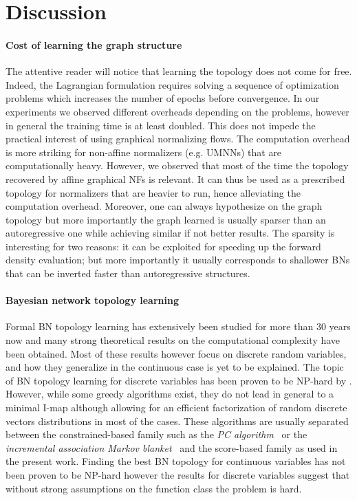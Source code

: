 \documentclass[twoside]{article}
\begin{document}



\section{Discussion}
\paragraph{Cost of learning the graph structure}
The attentive reader will notice that learning the topology does not come for free. Indeed, the Lagrangian formulation requires solving a sequence of optimization problems which increases the number of epochs before convergence. In our experiments we observed different overheads depending on the problems, however in general the training time is at least doubled. This does not impede the practical interest of using graphical normalizing flows. The computation overhead is more striking for non-affine normalizers (e.g. UMNNs) that are computationally heavy. However, we observed that most of the time the topology recovered by affine graphical NFs is relevant. It can thus be used as a prescribed topology for normalizers that are heavier to run, hence alleviating the computation overhead. Moreover, one can always hypothesize on the graph topology but more importantly the graph learned is usually sparser than an autoregressive one while achieving similar if not better results. The sparsity is interesting for two reasons: it can be exploited for speeding up the forward density evaluation; but more importantly it usually corresponds to shallower BNs that can be inverted faster than autoregressive structures.
\paragraph{Bayesian network topology learning}
Formal BN topology learning has extensively been studied for more than 30 years now and many strong theoretical results on the computational complexity have been obtained. Most of these results however focus on discrete random variables, and how they generalize in the continuous case is yet to be explained. The topic of BN topology learning for discrete variables has been proven to be NP-hard by \citet{chickering-NP-hard}. However, while some greedy algorithms exist, they do not lead in general to a minimal I-map although allowing for an efficient factorization of random discrete vectors distributions in most of the cases. These algorithms are usually separated between the constrained-based family such as the \textit{PC algorithm}~\citep{pc-algorithm} or the \textit{incremental association Markov blanket}~\citep{PGM-book} and the score-based family as used in the present work.
Finding the best BN topology for continuous variables has not been proven to be NP-hard however the results for discrete variables suggest that without strong assumptions on the function class the problem is hard.
\end{document}
